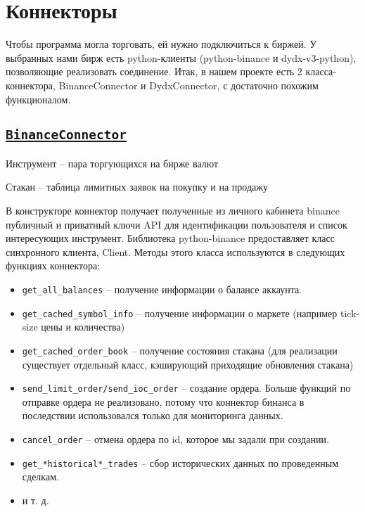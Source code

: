 \section{Коннекторы}

Чтобы программа могла торговать, ей нужно подключиться к биржей. У выбранных нами бирж есть python-клиенты (python-binance и dydx-v3-python), позволяющие реализовать соединение. Итак, в нашем проекте есть 2 класса-коннектора, BinanceConnector и DydxConnector, с достаточно похожим функционалом.

\subsection{\href{https://github.com/dexety/dex-trading-system/blob/main/connectors/binance/connector.py}{\texttt{BinanceConnector}}}

\begin{definition}
Инструмент -- пара торгующихся на бирже валют
\end{definition}
\begin{definition}
Стакан -- таблица лимитных заявок на покупку и на продажу
\end{definition}

В конструкторе коннектор получает полученные из личного кабинета binance публичный и приватный ключи API для идентификации пользователя и список интересующих инструмент. Библиотека python-binance предоставляет класс синхронного клиента, Client. Методы этого класса используются в следующих функциях коннектора:

\begin{itemize}
    \item \texttt{get\_all\_balances} -- получение информации о балансе аккаунта.
    \item \texttt{get\_cached\_symbol\_info} -- получение информации о маркете (например tick-size цены и количества)
    \item \texttt{get\_cached\_order\_book} -- получение состояния стакана (для реализации существует отдельный класс, кэширующий приходящие обновления стакана)
    \item \texttt{send\_limit\_order/send\_ioc\_order} -- создание ордера. Больше функций по отправке ордера не реализовано, потому что коннектор бинанса в последствии использовался только для мониторинга данных.
    \item \texttt{cancel\_order} -- отмена ордера по id, которое мы задали при создании.
    \item \texttt{get\_*historical*\_trades} -- сбор исторических данных по проведенным сделкам.
    \item и т. д.
\end{itemize}

